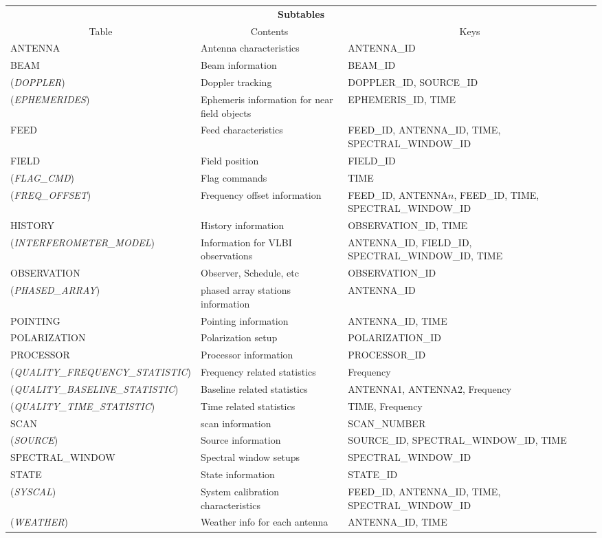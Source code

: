 \documentclass{article}
\begin{document}
\begin{tabular}{|l|p{1.5in}|p{1.6in}|} \hline
\multicolumn{3}{|c|}{\bf Subtables}\\ \cline{1-3}
\multicolumn{1}{|c|}{Table}&\multicolumn{1}{|c|}{Contents}&\multicolumn{1}{|c|}{Keys}\\ \cline{1-3}
ANTENNA& Antenna characteristics & ANTENNA\_ID \\
BEAM & Beam information & BEAM\_ID\\
({\it DOPPLER}) & Doppler tracking & DOPPLER\_ID, SOURCE\_ID \\
({\it EPHEMERIDES}) & Ephemeris information for near field objects & EPHEMERIS\_ID, TIME \\
FEED  &          Feed characteristics & FEED\_ID, ANTENNA\_ID, TIME, SPECTRAL\_WINDOW\_ID \\
FIELD  &         Field position & FIELD\_ID  \\
({\it FLAG\_CMD})  &  Flag commands & TIME \\
({\it FREQ\_OFFSET}) & Frequency offset information & FEED\_ID, ANTENNA$n$, FEED\_ID, TIME, SPECTRAL\_WINDOW\_ID \\
HISTORY  & History information & OBSERVATION\_ID, TIME \\
({\it INTERFEROMETER\_MODEL}) &  Information for VLBI observations &  ANTENNA\_ID, FIELD\_ID, SPECTRAL\_WINDOW\_ID, TIME \\
OBSERVATION  &Observer, Schedule, etc & OBSERVATION\_ID \\ 
({\it PHASED\_ARRAY}) & phased array stations information & ANTENNA\_ID \\
POINTING & Pointing information & ANTENNA\_ID, TIME \\
POLARIZATION &Polarization setup & POLARIZATION\_ID \\
PROCESSOR & Processor information & PROCESSOR\_ID  \\
({\it QUALITY\_FREQUENCY\_STATISTIC}) & Frequency related statistics & Frequency  \\
({\it QUALITY\_BASELINE\_STATISTIC}) & Baseline related statistics & ANTENNA1, ANTENNA2, Frequency \\
({\it QUALITY\_TIME\_STATISTIC}) & Time related statistics & TIME, Frequency \\
SCAN  & scan information & SCAN\_NUMBER \\
({\it SOURCE})  &        Source information & SOURCE\_ID, SPECTRAL\_WINDOW\_ID, TIME \\
SPECTRAL\_WINDOW  &     Spectral window setups & SPECTRAL\_WINDOW\_ID \\
STATE   & State information & STATE\_ID \\
({\it SYSCAL}) &         System calibration characteristics & FEED\_ID, ANTENNA\_ID, TIME, SPECTRAL\_WINDOW\_ID \\
({\it WEATHER})  &       Weather info for each antenna & ANTENNA\_ID, TIME \\
\hline
\end{tabular}
\end{document}
